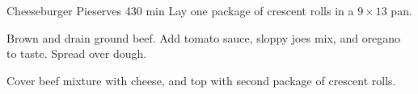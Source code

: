 
\begin{recipe}{Cheeseburger Pie}{serves 4}{30 min}
    Lay one package of crescent rolls in a $9 \times 13$ pan.

    Brown and drain ground beef. Add tomato sauce, sloppy joes mix, and oregano to taste. Spread over dough.

    Cover beef mixture with cheese, and top with second package of crescent rolls.

\end{recipe}
